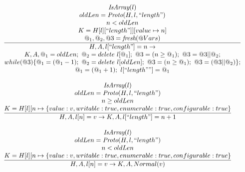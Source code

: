\documentclass[a4paper, leqno]{amsart}
\newcommand{\dquote}[1]{\text{``}#1\text{''}}
\newcommand{\semanticrule}[2]{
	\frac{\ensuremath{\begin{matrix}#1\end{matrix}}}
		{\ensuremath{\begin{matrix}#2\end{matrix}}}
}
\newcommand{\configfromto}[6]{
	\ensuremath{#1,#2,#3 \rightarrow #4,#5,#6}
}
\begin{document}
\[\begin{array}{l@{}l@{}ll}
 & & 
\semanticrule
	{\emph{IsArray}(l) \\
	 oldLen = \emph{Proto}(H,l,\dquote{length}) \\
	 n < oldLen \\
	 K = H[l][\dquote{length}]][value\mapsto n] \\
	 @_1,@_2,@3 = \emph{fresh}(@Vars)}
	{H,A,l[\dquote{length}] = n \rightarrow \\
	 K,A,@_1 = oldLen;\ @_2 = delete \ l[@_1];\ @3 = (n\geq@_1);\ @3 = @3 || @_2; \\
	 while(@3)\{@_1=(@_1-1);\ @_2=delete \ l[oldLen];\ @3=(n\geq@_1);\ @3=(@3||@_2)\}; \\
	 @_1 = (@_1 + 1);\ l[\dquote{length}"] = @_1} &
\\ & & \\

 & & 
\semanticrule
	{\emph{IsArray}(l) \\
	 oldLen = \emph{Proto}(H,l,\dquote{length}) \\
	 n \geq oldLen \\
	 K = H[l][n \mapsto \{value:v,writable:true,enumerable:true,configurable:true\}}
	{\configfromto
		{H}{A}{l[n] = v}
		{K}{A}{l[\dquote{length}]=n+1}} &
\\ & & \\

 & & 
\semanticrule
	{\emph{IsArray}(l) \\
	 oldLen = \emph{Proto}(H,l,\dquote{length}) \\
	 n < oldLen \\
	 K = H[l][n \mapsto \{value:v,writable:true,enumerable:true,configurable:true\}}
	{\configfromto
		{H}{A}{l[n] = v}
		{K}{A}{Normal(v)}} &
\\ & & \\

\end{array}
\]
\end{document}
